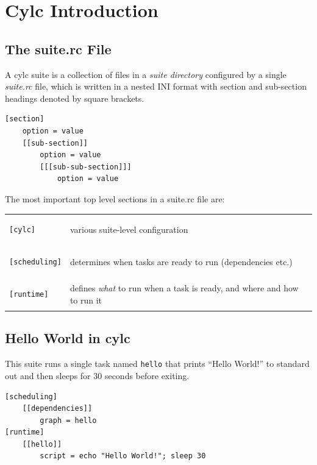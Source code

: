 \section{Cylc Introduction}


\subsection{The suite.rc File}

A cylc suite is a collection of files in a {\em suite directory} configured by
a single {\em suite.rc} file, which is written in a nested INI format with
section and sub-section headings denoted by square brackets.

\begin{lstlisting}[language=suiterc]
[section]
    option = value
    [[sub-section]]
        option = value
        [[[sub-sub-section]]]
            option = value
\end{lstlisting}

The most important top level sections in a suite.rc file are:

\begin{tabular}{ll}
\begin{lstlisting}
[cylc]
\end{lstlisting} & various suite-level configuration\\
\begin{lstlisting}
[scheduling]
\end{lstlisting} & determines when tasks are ready to run (dependencies etc.)\\
\begin{lstlisting}
[runtime]
\end{lstlisting} & defines {\em what} to run when a task is ready, and
where and how to run it \\
\end{tabular}


\subsection{Hello World in cylc}

This suite runs a single task named \lstinline{hello} that prints ``Hello
World!'' to standard out and then sleeps for 30 seconds before exiting.


\begin{lstlisting}[language=suiterc]
[scheduling]
    [[dependencies]]
        graph = hello
[runtime]
    [[hello]]
        script = echo "Hello World!"; sleep 30
\end{lstlisting}

